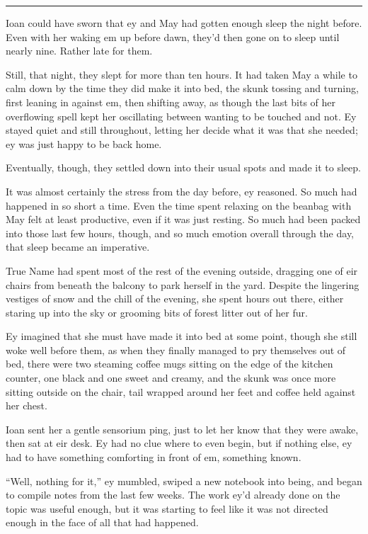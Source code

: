 \begin{center}\rule{0.5\linewidth}{0.5pt}\end{center}

Ioan could have sworn that ey and May had gotten enough sleep the night before. Even with her waking em up before dawn, they'd then gone on to sleep until nearly nine. Rather late for them.

Still, that night, they slept for more than ten hours. It had taken May a while to calm down by the time they did make it into bed, the skunk tossing and turning, first leaning in against em, then shifting away, as though the last bits of her overflowing spell kept her oscillating between wanting to be touched and not. Ey stayed quiet and still throughout, letting her decide what it was that she needed; ey was just happy to be back home.

Eventually, though, they settled down into their usual spots and made it to sleep.

It was almost certainly the stress from the day before, ey reasoned. So much had happened in so short a time. Even the time spent relaxing on the beanbag with May felt at least productive, even if it was just resting. So much had been packed into those last few hours, though, and so much emotion overall through the day, that sleep became an imperative.

True Name had spent most of the rest of the evening outside, dragging one of eir chairs from beneath the balcony to park herself in the yard. Despite the lingering vestiges of snow and the chill of the evening, she spent hours out there, either staring up into the sky or grooming bits of forest litter out of her fur.

Ey imagined that she must have made it into bed at some point, though she still woke well before them, as when they finally managed to pry themselves out of bed, there were two steaming coffee mugs sitting on the edge of the kitchen counter, one black and one sweet and creamy, and the skunk was once more sitting outside on the chair, tail wrapped around her feet and coffee held against her chest.

Ioan sent her a gentle sensorium ping, just to let her know that they were awake, then sat at eir desk. Ey had no clue where to even begin, but if nothing else, ey had to have something comforting in front of em, something known.

``Well, nothing for it,'' ey mumbled, swiped a new notebook into being, and began to compile notes from the last few weeks. The work ey'd already done on the topic was useful enough, but it was starting to feel like it was not directed enough in the face of all that had happened.

